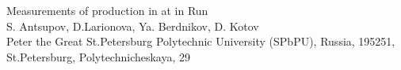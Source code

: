 \begin{titlepage}
    \begin{center}
        {
			\LARGE Measurements of \Kstar production in \colsystem at \snntwohundred in Run\runnumber
        } \\
        \vspace{15mm}
				S. Antsupov, D.Larionova, Ya. Berdnikov, D. Kotov\\
        \vspace{1cm}
        Peter the Great St.Petersburg Polytechnic University (SPbPU),
        Russia, 195251, St.Petersburg, Polytechnicheskaya, 29\\
    \end{center}
    \vspace{2cm}
    \date{today}
    \vspace{2cm}
    \begin{abstract}
       This analysis note presents analysis procedures for estimation of invariant \pt spectra and nuclear modification factors of $(K^{*0}(892) + (\bar{K}^{*0}(892))/2$ mesons as functions of \pt in PHENIX Run\runnumber \colsystem collision system at \snntwohundred.
    \end{abstract}
\end{titlepage}
